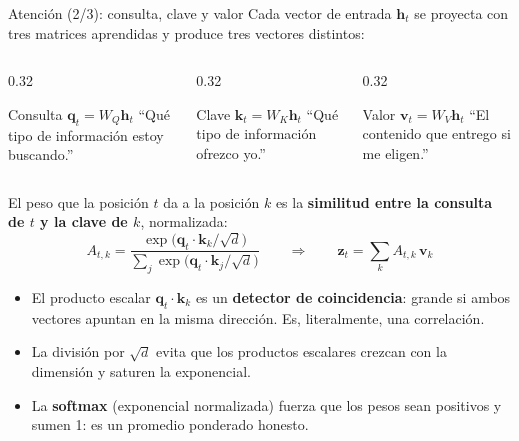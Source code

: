 \documentclass[aspectratio=169,10pt]{beamer}
\newcommand{\term}[1]{\textbf{\color{deepgreen}#1}}
\begin{document}
\begin{frame}[c]{Atención (2/3): consulta, clave y valor}
  \small
  Cada vector de entrada $\mathbf{h}_t$ se proyecta con tres matrices aprendidas y produce tres vectores distintos:
  \vspace{1mm}
  \begin{columns}[t,totalwidth=\linewidth]
    \begin{column}{0.32\linewidth}
      \begin{block}{Consulta $\mathbf{q}_t = W_Q\mathbf{h}_t$}
        \scriptsize ``Qué tipo de información estoy buscando.''
      \end{block}
    \end{column}
    \begin{column}{0.32\linewidth}
      \begin{block}{Clave $\mathbf{k}_t = W_K\mathbf{h}_t$}
        \scriptsize ``Qué tipo de información ofrezco yo.''
      \end{block}
    \end{column}
    \begin{column}{0.32\linewidth}
      \begin{block}{Valor $\mathbf{v}_t = W_V\mathbf{h}_t$}
        \scriptsize ``El contenido que entrego si me eligen.''
      \end{block}
    \end{column}
  \end{columns}
  \vspace{3mm}
  El peso que la posición $t$ da a la posición $k$ es la \term{similitud entre la consulta de $t$ y la clave de $k$}, normalizada:
  \[
    A_{t,k} = \frac{\exp\!\big(\mathbf{q}_t\cdot\mathbf{k}_k/\sqrt{d}\big)}{\sum_{j}\exp\!\big(\mathbf{q}_t\cdot\mathbf{k}_j/\sqrt{d}\big)}
    \qquad\Longrightarrow\qquad
    \mathbf{z}_t = \sum_k A_{t,k}\,\mathbf{v}_k
  \]
  \vspace{1mm}
  \begin{itemize}\scriptsize
    \item El producto escalar $\mathbf{q}_t\cdot\mathbf{k}_k$ es un \term{detector de coincidencia}: grande si ambos vectores apuntan en la misma dirección. Es, literalmente, una correlación.
    \item La división por $\sqrt{d}$ evita que los productos escalares crezcan con la dimensión y saturen la exponencial.
    \item La \term{softmax} (exponencial normalizada) fuerza que los pesos sean positivos y sumen 1: es un promedio ponderado honesto.
  \end{itemize}
\end{frame}
\end{document}
